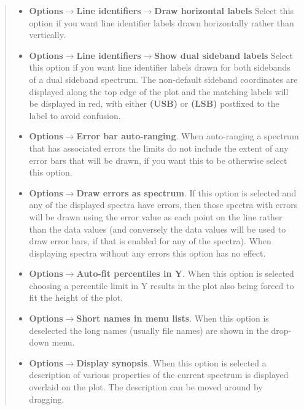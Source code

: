 \documentclass[twoside,11pt]{article}
\newcommand{\latexhtml}[2]{#1}
\renewcommand{\_}{\texttt{\symbol{95}}}
\newcommand{\submenuitem}[2]{\latexhtml{\textbf{#1$\rightarrow$#2}}{\textbf{#1->#2}}}
\newcommand{\subsubmenuitem}[3]{\latexhtml{\textbf{#1$\rightarrow$#2$\rightarrow$#3}}{\textbf{#1->#2->#3}}}
\newcommand{\labelitem}[1]{\textbf{#1}}
\begin{document}
\begin{quote}
\begin{itemize}
  \item \subsubmenuitem{Options}{Line identifiers}{Draw horizontal labels}
  Select this option if you want line identifier labels drawn horizontally
  rather than vertically.

  \item \subsubmenuitem{Options}{Line identifiers}{Show dual sideband labels}
  Select this option if you want line identifier labels drawn for both
  sidebands of a dual sideband spectrum. The non-default sideband coordinates
  are displayed along the top edge of the plot and the matching labels
  will be displayed in red, with either \labelitem{(USB)} or
  \labelitem{(LSB)} postfixed to the label to avoid confusion.

  \item \submenuitem{Options}{Error bar auto-ranging}. When auto-ranging a
  spectrum that has associated errors the limits do not include the extent of
  any error bars that will be drawn, if you want this to be otherwise select
  this option.

  \item \submenuitem{Options}{Draw errors as spectrum}. If this option is
  selected and any of the displayed spectra have errors, then those spectra
  with errors will be drawn using the error value as each point on the line
  rather than the data values (and conversely the data values will be used to
  draw error bars, if that is enabled for any of the spectra). When displaying
  spectra without any errors this option has no effect.

  \item \submenuitem{Options}{Auto-fit percentiles in Y}. When this option is
  selected choosing a percentile limit in Y results in the plot also being
  forced to fit the height of the plot.

  \item \submenuitem{Options}{Short names in menu lists}. When this option is
  deselected the long names (usually file names) are shown in the
  \label{Displaying:} drop-down menu.

  \item \submenuitem{Options}{Display synopsis}. When this option is selected
  a description of various properties of the current spectrum is displayed
  overlaid on the plot. The description can be moved around by dragging.


\end{itemize}
\end{quote}
\end{document}
